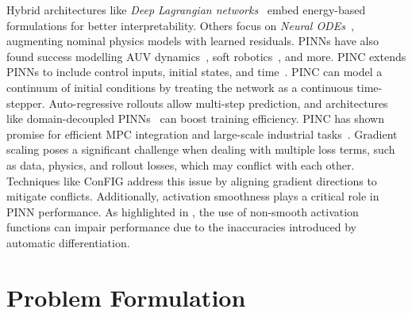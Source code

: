 \documentclass[conference]{IEEEtran}
\begin{document}
Hybrid architectures like \textit{Deep Lagrangian networks}~\cite{lutter_combining_2023} embed energy-based formulations for better interpretability. Others focus on \textit{Neural ODEs}~\cite{ma_development_2024, chen2018neural}, augmenting nominal physics models with learned residuals. PINNs have also found success modelling AUV dynamics~\cite{zhao_research_2024}, soft robotics~\cite{gao_sim--real_2024}, and more. PINC extends PINNs to include control inputs, initial states, and time~\cite{antonelo_physics-informed_2024}. PINC can model a continuum of initial conditions by treating the network as a continuous time-stepper. Auto-regressive rollouts allow multi-step prediction, and architectures like domain-decoupled PINNs~\cite{krauss_domain-decoupled_2024} can boost training efficiency. PINC has shown promise for efficient MPC integration and large-scale industrial tasks~\cite{kittelsen_physics-informed_2024}. Gradient scaling poses a significant challenge when dealing with multiple loss terms, such as data, physics, and rollout losses, which may conflict with each other. Techniques like ConFIG \cite{liu_config_2024} address this issue by aligning gradient directions to mitigate conflicts. Additionally, activation smoothness plays a critical role in PINN performance. As highlighted in \cite{nicodemus_physics-informed_2022}, the use of non-smooth activation functions can impair performance due to the inaccuracies introduced by automatic differentiation.



\section{Problem Formulation} %
\label{sec:problem}
\end{document}

